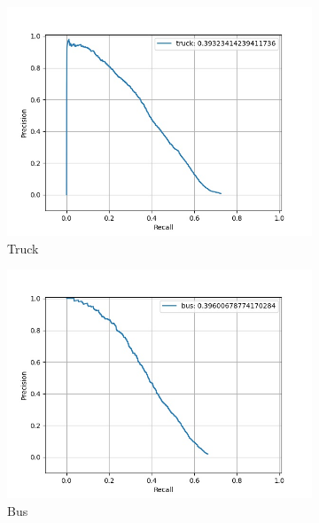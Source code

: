 \begin{figure}
    	\begin{subfigure}[t]{0.325\textwidth}
    		\centering
    		\includegraphics[width=\textwidth]{images/tuned_pr/class_truck_pr.jpg}
    		\caption{Truck}
    	\end{subfigure}
    	\begin{subfigure}[t]{0.325\textwidth}
    		\centering
    		\includegraphics[width=\textwidth]{images/tuned_pr/class_bus_pr.jpg}
    		\caption{Bus}
    	\end{subfigure}
    	\begin{subfigure}[t]{0.325\textwidth}
    		\centering

\end{subfigure}
\end{figure}
